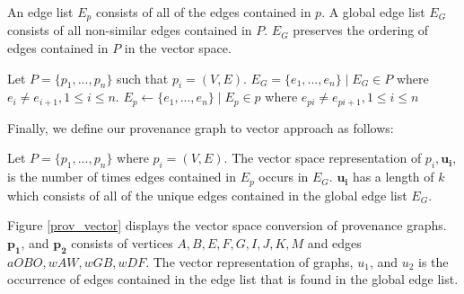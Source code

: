







An edge list $E_{p}$ consists of all of the edges contained in $p$. A global edge list $E_{G}$ consists of all non-similar edges contained in $P$. $E_{G}$ preserves the ordering of edges contained in $P$ in the vector space. 

\begin{definition}

Let $P = \{p_1,...,p_n\}$ such that $p_i = (V, E)$. $E_{G} = \{ e_1,...,e_n\} \mid E_{G}  \in P$ where $e_i \neq e_{i+1}, 1 \leq i \leq n$. $E_{p} \gets \{e_1,...,e_n\} \mid E_{p} \in p$ where  $e_{pi} \neq e_{pi+1}, 1 \leq i \leq n$

\end{definition}


Finally, we define our provenance graph to vector approach as follows:

\begin{definition}
Let $P = \{p_1,...,p_n\}$ where $p_i = (V, E)$. The vector space representation of $p_i, \boldsymbol{u_i}$, is the number of times edges contained in $E_{p}$ occurs in $E_{G}$. $\boldsymbol{u_i}$ has a length of $k$ which consists of all of the unique edges contained in the global edge list  $E_{G}$. 




 
%
%

\end{definition}



Figure \ref{prov_vector} displays the vector space conversion of provenance graphs. $\boldsymbol{p_1}$, and $\boldsymbol{p_2}$ consists of vertices $A,B,E,F,G, I, J, K, M$ and edges $aOBO, wAW, wGB, wDF$. The vector representation of graphs, $u_1$, and $u_2$ is the occurrence of edges contained in the edge list that is found in the global edge list. 

